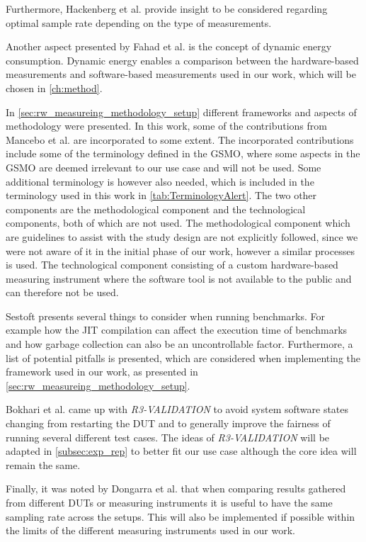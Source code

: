 Furthermore, Hackenberg et al.\cite{hackenberg2013} provide insight to be considered regarding optimal sample rate depending on the type of measurements.

Another aspect presented by Fahad et al.\cite{fahad2019comparative} is the concept of dynamic energy consumption. Dynamic energy enables a comparison between the hardware-based measurements and software-based measurements used in our work, which will be chosen in \cref{ch:method}.\newline


In \cref{sec:rw_measureing_methodology_setup} different frameworks and aspects of methodology were presented. In this work, some of the contributions from Mancebo et al. \cite{GarciaFEETINGS} are incorporated to some extent. The incorporated contributions include some of the terminology defined in the GSMO, where some aspects in the GSMO are deemed irrelevant to our use case and will not be used. Some additional terminology is however also needed, which is included in the terminology used in this work in \cref{tab:TerminologyAlert}. The two other components are the methodological component and the technological components, both of which are not used. The methodological component which are guidelines to assist with the study design are not explicitly followed, since we were not aware of it in the initial phase of our work, however a similar processes is used. The technological component consisting of a custom hardware-based measuring instrument where the software tool is not available to the public and can therefore not be used.\newline

Sestoft\cite{sestoft2013microbenchmarks} presents several things to consider when running benchmarks. For example how the JIT compilation can affect the execution time of benchmarks and how garbage collection can also be an uncontrollable factor. Furthermore, a list of potential pitfalls is presented, which are considered when implementing the framework used in our work, as presented in \cref{sec:rw_measureing_methodology_setup}.\newline

Bokhari et al.\cite{Bokhari2020r3} came up with \textit{R3-VALIDATION} to avoid system software states changing from restarting the DUT and to generally improve the fairness of running several different test cases. The ideas of \textit{R3-VALIDATION} will be adapted in \cref{subsec:exp_rep} to better fit our use case although the core idea will remain the same.\newline

Finally, it was noted by Dongarra et al.\cite{Dongarra2012} that when comparing results gathered from different DUTs or measuring instruments it is useful to have the same sampling rate across the setups. This will also be implemented if possible within the limits of the different measuring instruments used in our work.

